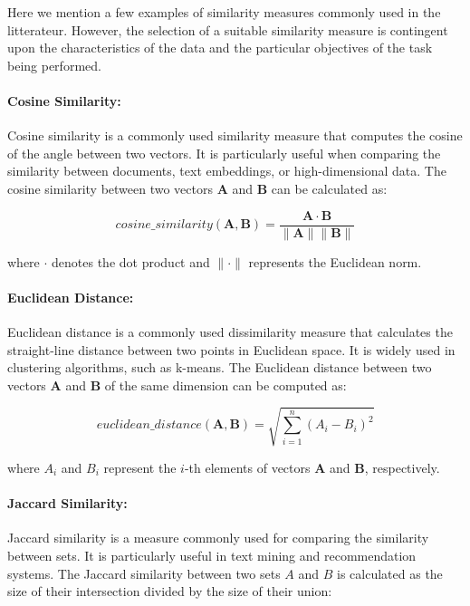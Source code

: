 \documentclass[a4paper,12pt]{article}
\begin{document}
Here we mention a few examples of similarity measures commonly used in the litterateur. However, the selection of a suitable similarity measure is contingent upon the characteristics of the data and the particular objectives of the task being performed.


\paragraph{Cosine Similarity:}

Cosine similarity is a commonly used similarity measure that computes the cosine of the angle between two vectors. It is particularly useful when comparing the similarity between documents, text embeddings, or high-dimensional data. The cosine similarity between two vectors $\mathbf{A}$ and $\mathbf{B}$ can be calculated as:

$$cosine\_similarity(\mathbf{A}, \mathbf{B}) = \frac{\mathbf{A} \cdot \mathbf{B}}{\|\mathbf{A}\| \|\mathbf{B}\|}$$

where $\cdot$ denotes the dot product and $\|\cdot\|$ represents the Euclidean norm.

\paragraph{Euclidean Distance:}

Euclidean distance is a commonly used dissimilarity measure that calculates the straight-line distance between two points in Euclidean space. It is widely used in clustering algorithms, such as k-means. The Euclidean distance between two vectors $\mathbf{A}$ and $\mathbf{B}$ of the same dimension can be computed as:

$$
euclidean\_distance(\mathbf{A}, \mathbf{B}) = \sqrt{\sum_{i=1}^{n} (A_i - B_i)^2}
$$

where $A_i$ and $B_i$ represent the $i$-th elements of vectors $\mathbf{A}$ and $\mathbf{B}$, respectively.

\paragraph{Jaccard Similarity:}

Jaccard similarity \cite{jaccard} is a measure commonly used for comparing the similarity between sets. It is particularly useful in text mining and recommendation systems. The Jaccard similarity between two sets $A$ and $B$ is calculated as the size of their intersection divided by the size of their union:
\end{document}
